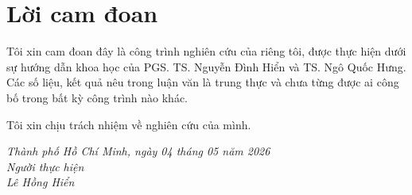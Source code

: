 \chapter*{\centering\Large{Lời cam đoan}}

Tôi xin cam đoan đây là công trình nghiên cứu của riêng tôi, được thực hiện dưới sự hướng dẫn khoa học của PGS. TS. Nguyễn Đình Hiển và TS. Ngô Quốc Hưng. Các số liệu, kết quả nêu trong luận văn là trung thực và chưa từng được ai công bố trong bất kỳ công trình nào khác.

Tôi xin chịu trách nhiệm về nghiên cứu của mình.

\begin{flushright}
\textit{Thành phố Hồ Chí Minh, ngày 04 tháng 05 năm 2026} \\
\textit{Người thực hiện} \\[1cm]
\textit{Lê Hồng Hiển}
\end{flushright}
